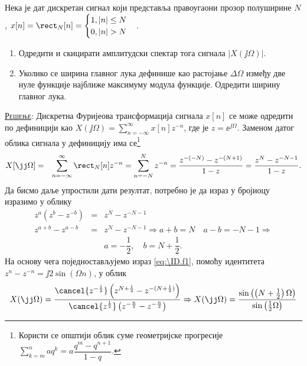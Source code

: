 \PID\mnImportant\label{z:dtft_rec}
Нека је дат дискретан сигнал који представља правоугаони прозор полуширине $N$,  
$x[n] = \rect_N[n] = \begin{cases}
    1, |n| \leq N \\
    0, |n| > N
\end{cases}$. 
\begin{enumerate}[label=(\alph*)]
    \item Одредити и скицирати амплитудски спектар тога сигнала $|X(\jj\Omega)|$.
    \item Уколико се ширина главног лука дефинише као растојање $\Delta \Omega$ између две нуле функције најближе 
    максимуму модула функције. Одредити ширину главног лука. 
\end{enumerate}

\textsc{\underline{Решење}:}
Дискретна Фуријеова трансформација сигнала $x[n]$ се може одредити по дефиницији као 
$X(\jj\Omega) = \sum_{n = -\infty}^{\infty} x[n] z^{-n}$, где је $z = \ee^{\jj\Omega}$. Заменом датог облика сигнала 
у дефиницију има се\footnote{Користи се општији облик суме геометријске прогресије
    $\sum_{k = m}^n a q^k = a\dfrac{q^m - q^{n+1}}{1-q}$.
}
\begin{eqnarray}
    X[\jj\Omega] &=& \sum_{n = -\infty}^{\infty} \rect_N[n] z^{-n} = \sum_{n = -N}^N z^{-n} 
    = \dfrac{ z^{-(-N)} - z^{-(N+1)} }{1 - z} = 
    \dfrac{z^{N} - z^{-N-1}}{1 - z}. \label{eq:\ID.f1}
\end{eqnarray}
Да бисмо даље упростили дати резултат, потребно је да израз у бројиоцу изразимо у облику
\begin{eqnarray}
    z^a(z^b - z^{-b}) &=& z^{N} - z^{-N-1}  \\[2mm]
    z^{a+b} - z^{a-b} &=& z^{N} - z^{-N-1} \Rightarrow
    a+b = N\quad a-b = -N-1  
    \Rightarrow \\
    && a = -\dfrac{1}{2}, \quad b = N + \dfrac{1}{2}.
\end{eqnarray}
На основу чега поједностављујемо израз \ref{eq:\ID.f1}, помоћу идентитета 
$z^n - z^{-n} = \jj 2 \sin(\Omega n)$, у облик 
\begin{equation}
    X(\jj\Omega) = \dfrac{ \cancel{z^{-\frac12}}\left( z^{N + \frac12} - z^{-(N + \frac12)} \right)  }
    { \cancel{z^{\frac12}} \left( z^{-\frac n2} - z^{-\frac n2} \right)}
    \Rightarrow
    X(\jj\Omega) 
    = \dfrac{\sin \left( \left(N + \frac12\right) \Omega \right) }{ \sin \left(  \frac12 \Omega \right)}
    \label{\ID:eq_rez}
\end{equation}

